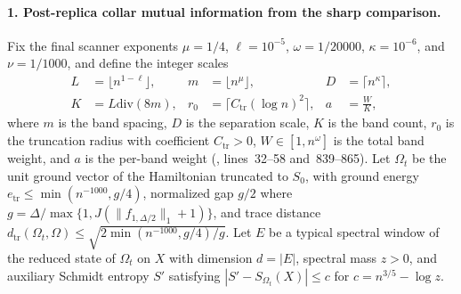 \documentclass{article}
\begin{document}
\paragraph{1. Post-replica collar mutual information from the sharp comparison.}
Fix the final scanner exponents $\mu = 1/4$, $\ell = 10^{-5}$,
$\omega = 1/20000$, $\kappa = 10^{-6}$, and $\nu = 1/1000$, and define the
integer scales
\begin{align}
    L   & = \lfloor n^{1 - \ell}\rfloor,             &
    m   & = \lfloor n^\mu\rfloor,                    &
    D   & = \lceil n^\kappa\rceil, \nonumber           \\
    K   & = L \mathbin{\mathrm{div}} (8m),           &
    r_0 & = \lceil C_{\mathrm{tr}} (\log n)^2\rceil, &
    a   & = \frac{W}{K},
    \label{eq:safe_box_collar_scales}
\end{align}
where $m$ is the band spacing, $D$ is the separation scale, $K$ is the band
count, $r_0$ is the truncation radius with coefficient $C_{\mathrm{tr}} > 0$,
$W \in [1, n^\omega]$ is the total band weight, and $a$ is the per-band weight
(, lines~32--58 and~839--865). Let $\Omega_t$ be the unit
ground vector of the Hamiltonian truncated to $S_0$, with ground energy
$e_{\mathrm{tr}} \le \min(n^{-1000}, g/4)$, normalized gap $g/2$ where
$g = \Delta / \max\{1, J(\|f_{1,\Delta/2}\|_1 + 1)\}$, and trace distance
$d_{\mathrm{tr}}(\Omega_t, \Omega) \le \sqrt{2\min(n^{-1000}, g/4)/g}$. Let
$E$ be a typical spectral window of the reduced state of $\Omega_t$ on $X$ with
dimension $d = |E|$, spectral mass $z > 0$, and auxiliary Schmidt entropy $S'$
satisfying $|S' - S_{\Omega_t}(X)| \le c$ for $c = n^{3/5} - \log z$.
\end{document}
